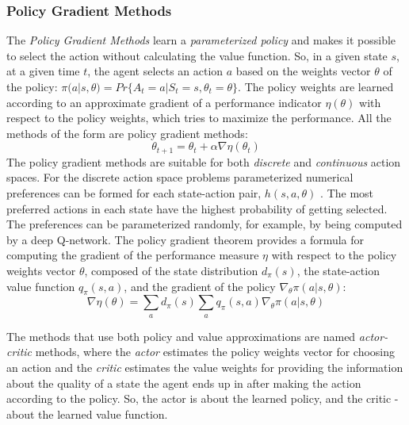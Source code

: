 \subsubsection{Policy Gradient Methods} \label{PolicyGradMeths}
The \textit{Policy Gradient Methods} learn a \textit{parameterized policy} and makes it possible to select the action without calculating the value function. So, in a given state $s$, at a given time $t$, the agent selects an action $a$ based on the weights vector ${\theta}$ of the policy: ${\pi}(a|s,{\theta})=Pr\{A_{t}=a|S_{t}=s,{\theta}_{t}={\theta}\}$. The policy weights are learned according to an approximate gradient of a performance indicator ${\eta}({\theta})$ with respect to the policy weights, which tries to maximize the performance. All the methods of the form  are policy gradient methods:
\begin{equation}\label{gradM}
\theta_{t+1}=\theta_{t}+\alpha \nabla \eta (\theta_{t})
\end{equation}
The policy gradient methods are suitable for both \textit{discrete} and \textit{continuous} action spaces. For the discrete action space problems parameterized numerical preferences can be formed for each state-action pair, $h(s,a,\theta)$ \cite{Sutton}. The most preferred actions in each state have the highest probability of getting selected. The preferences can be parameterized randomly, for example, by being computed by a deep Q-network. The policy gradient theorem provides a formula for computing the gradient of the performance measure $\eta$ with respect to the policy weights vector $\theta$, composed of the state distribution $d_{\pi}(s)$, the state-action value function $q_{\pi}(s,a)$, and the gradient of the policy $\nabla_{\theta}\pi(a|s,\theta)$:
\begin{equation}\label{gradMTheorem}
\nabla\eta(\theta)=\sum_{a}d_{\pi}(s)\sum_{a}q_{\pi}(s,a)\nabla_{\theta}\pi(a|s,\theta)
\end{equation}

The methods that use both policy and value approximations are named \textit{actor-critic} methods, where the \textit{actor} estimates the policy weights vector for choosing an action and the \textit{critic} estimates the value weights for providing the information about the quality of a state the agent ends up in after making the action according to the policy. So, the actor is about the learned policy, and the critic - about the learned value function. 

